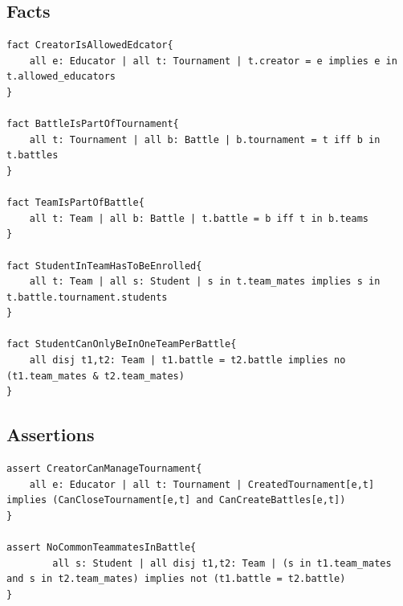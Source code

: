 \documentclass{article}
\begin{document}
\subsection{Facts}
\begin{lstlisting}[language=alloy]
fact CreatorIsAllowedEdcator{
    all e: Educator | all t: Tournament | t.creator = e implies e in t.allowed_educators
}

fact BattleIsPartOfTournament{
    all t: Tournament | all b: Battle | b.tournament = t iff b in t.battles
}

fact TeamIsPartOfBattle{
    all t: Team | all b: Battle | t.battle = b iff t in b.teams
}

fact StudentInTeamHasToBeEnrolled{
    all t: Team | all s: Student | s in t.team_mates implies s in t.battle.tournament.students
}

fact StudentCanOnlyBeInOneTeamPerBattle{
	all disj t1,t2: Team | t1.battle = t2.battle implies no (t1.team_mates & t2.team_mates)
}
\end{lstlisting}

\subsection{Assertions}
\begin{lstlisting}[language=alloy]
assert CreatorCanManageTournament{
    all e: Educator | all t: Tournament | CreatedTournament[e,t] implies (CanCloseTournament[e,t] and CanCreateBattles[e,t])
}

assert NoCommonTeammatesInBattle{
        all s: Student | all disj t1,t2: Team | (s in t1.team_mates and s in t2.team_mates) implies not (t1.battle = t2.battle)
}
\end{lstlisting}
\end{document}
